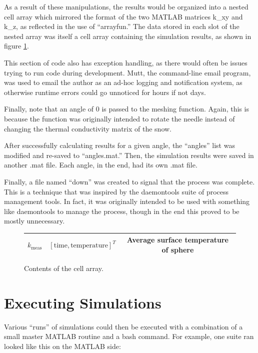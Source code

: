 As a result of these manipulations, the results would be organized into a nested
cell array which mirrored the format of the two MATLAB matrices k\_xy and k\_z,
as reflected in the use of ``arrayfun.'' The data stored in each slot of the
nested array was itself a cell array containing the simulation results, as shown
in figure \ref{fig:cellarray}.

This section of code also has exception handling, as there would often be issues
trying to run code during development. Mutt, the command-line email program, was
used to email the author as an ad-hoc logging and notification system, as
otherwise runtime errors could go unnoticed for hours if not days.

Finally, note that an angle of \(0\) is passed to the meshing function. Again,
this is because the function was originally intended to rotate the needle
instead of changing the thermal conductivity matrix of the snow.

After successfully calculating results for a given angle, the ``angles'' list
was modified and re-saved to ``angles.mat.'' Then, the simulation results were
saved in another .mat file. Each angle, in the end, had its own .mat file. 

Finally, a file named ``down'' was created to signal that the process was
complete. This is a technique that was inspired by the daemontools suite of
process management tools. In fact, it was originally intended to be used with
something like daemontools to manage the process, though in the end this proved
to be mostly unnecessary.


\begin{figure}
\label{fig:cellarray}

\centering
\begin{tabular}{| c | c | c |}
\hline
\(k_\textrm{meas}\) & \( \left[ \textrm{time}, \textrm{temperature} \right]^T\) & Average surface temperature of sphere\\
\hline
\end{tabular}
\caption{Contents of the cell array.}
\end{figure}

\section{Executing Simulations}

Various ``runs'' of simulations could then be executed with a combination of a
small master MATLAB routine and a bash command. For example, one suite ran
looked like this on the MATLAB side:

